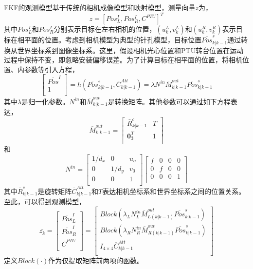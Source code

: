EKF的观测模型基于传统的相机成像模型和映射模型，测量向量$z$为，
\begin{equation}
z=[Pos^I_L, Pos^I_R, C^{PTU}]^T
\end{equation} 
其中$Pos^I_L$和$Pos^I_R$分别表示目标在左右相机的位置，$(u^L_k, v^L_k)$和$(u^R_k, v^R_k)$表示目标在相平面的位置。考虑到相机模型为典型的针孔模型，目标位置$\overline{Pos}^s_{k|k-1}$通过转换从世界坐标系到图像坐标系。这里，假设相机光心位置和PTU转台位置在运动过程中保持不变，即忽略安装偏移误差。为了计算目标在相平面的位置，将相机位置、内参数等引入方程，
\begin{equation}
\left[\begin{matrix}
\overline{Pos}^I \\
1\\
\end{matrix}\right]
=h(\overline{Pos}^s_{k|k-1}, \overline{C}^{Att}_{k|k-1})
=\lambda N^{in}\overline{M}^{out}_{k|k-1}\overline{Pos}^s_{k|k-1}
\end{equation}
其中$\lambda$是归一化参数。$N^{in}$和$\overline{M}^{out}_{k|k-1}$是转换矩阵。其他参数可以通过如下方程表达，
\begin{equation}
\overline{M}^{out}_{k|k-1}
= \left[
\begin{matrix}
\bar{R}^c_{k|k-1} & T \\
\textbf{0}^T_3 & 1 \\
\end{matrix}
\right]
\end{equation}
和
\begin{equation}
N^{in}=
\left[
\begin{matrix}
1/d_x & 0 & u_o \\
0 & 1/d_y & v_0 \\
0 & 0 & 1 \\
\end{matrix}
\right]
\left[
\begin{matrix}
f & 0 & 0 & 0 \\
0 & f & 0 & 0 \\
0 & 0 & 0 & 1 \\
\end{matrix}
\right]
\end{equation}
其中$\bar{R}^c_{k|k-1}$是旋转矩阵$\overline{C}^{Att}_{k|k-1}$和$T$表达相机坐标系和世界坐标系之间的位置关系。至此，可以得到观测模型，
\begin{equation}
\bar{z_k}=
\left[
\begin{matrix}
\overline{Pos}^I_L \\
\overline{Pos}^I_R \\
\overline{C}^{PTU} \\
\end{matrix}
\right]
=
\left[
\begin{matrix}
Block (\lambda_L N^{in}_L \overline{M}^{out}_{L(k|k-1)}\overline{Pos}^s_{k|k-1} )\\
Block (\lambda_R N^{in}_R\overline{M}^{out}_{R(k|k-1)}\overline{Pos}^s_{k|k-1}  )\\
I_{4 \times 4}\overline{C}^{Att}_{k|k-1} \\
\end{matrix}
\right]
\end{equation}
定义$Block(\cdot)$作为仅提取矩阵前两项的函数。


